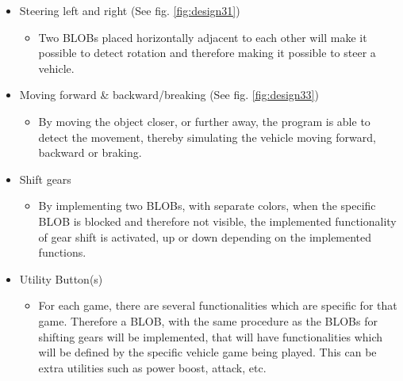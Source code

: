 \begin{itemize}
\item Steering left and right (See fig. \ref{fig:design31})
	\begin{itemize}
	\item Two BLOBs placed horizontally adjacent to each other will make it possible to detect rotation and therefore making it possible to steer a vehicle.
	\end{itemize}
	
\item Moving forward \& backward/breaking (See fig. \ref{fig:design33})
	\begin{itemize}
	\item By moving the object closer, or further away, the program is able to detect the movement, thereby simulating the vehicle moving forward, backward or braking.
	\end{itemize}
	
\item Shift gears
	\begin{itemize}
	\item By implementing two BLOBs, with separate colors, when the specific BLOB is blocked and therefore not visible, the implemented functionality of gear shift is activated, up or down depending on the implemented functions.
	\end{itemize}
	
\item Utility Button(s)
	\begin{itemize}
	\item For each game, there are several functionalities which are specific for that game. Therefore a BLOB, with the same procedure as the BLOBs for shifting gears will be implemented, that will have functionalities which will be defined by the specific vehicle game being played. This can be extra utilities such as power boost, attack, etc.
	\end{itemize}
\end{itemize}

